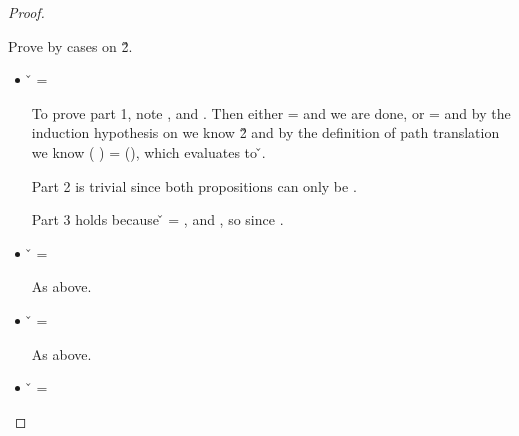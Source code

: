 \begin{lemma}
\begin{proof}
\begin{case}[B-Delta]
\begin{itemize}
\begin{subcase}[T-App]
\begin{itemize}
\begin{subcase}[\const{} = \classconst]
    Prove by cases on \v{2}.

        \begin{itemize}
          \item[] \begin{subcase}[\v{2} = \classvalue{\class{}} {\protect\overrightarrow {\classfieldpair{\fld{i}} {\v{i}}}}]
                    \v{} = \class{}

                    To prove part 1,
                    note
                     {\object{}},
                    and .
                    Then either \object{} = \emptyobject{} and we are done,
                    or \object{} = {} and
                    by the induction hypothesis on  we know \inopenv {\openv{}} {} {\v{2}}
                    and by the definition of path translation we know
                    {\openv{}}({\pth {\classpe{}} {}}) = {\appexp {\classconst{}} {{\openv{}}()}},
                    which evaluates to \v{}.

                    Part 2 is trivial since both propositions can only be \topprop{}.
                    
                    Part 3 holds because 
                    \v{} = \class{},
                    and
                    ,
                    so
                    {\judgementtwo{}{\v{}}{\t{}}}
                    since
                    {\judgementtwo{}{\class{}}{\Union{\Nil}{\Class}}}.
                  \end{subcase}
          \item[] \begin{subcase}[\v{2} = \class{}] \v{} = \Class{}

              As above.
                  \end{subcase}
          \item[] \begin{subcase}[\v{2} = \true{}] \v{} = \Boolean{}

              As above.
                  \end{subcase}
          \item[] \begin{subcase}[\v{2} = \false{}] \v{} = \Boolean{}



\end{subcase}
\end{itemize}
\end{subcase}
\end{itemize}
\end{subcase}
\end{itemize}
\end{case}
\end{proof}
\end{lemma}
